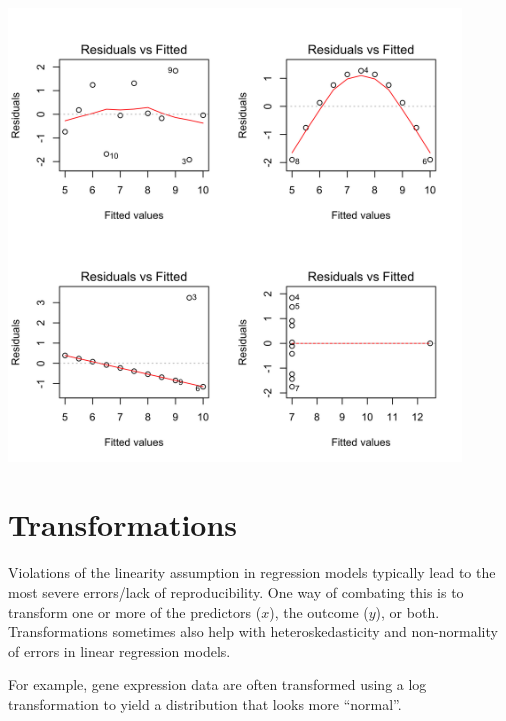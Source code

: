 \begin{center}
\includegraphics[width=0.9\textwidth]{img/anscombe-diagnostics-1.png}
\end{center}

\newpage


\section{Transformations}

Violations of the linearity assumption in regression models typically lead to the most severe errors/lack of reproducibility. One way of combating this is to transform one or more of the predictors ($x$), the outcome ($y$), or both. Transformations sometimes also help with heteroskedasticity and non-normality of errors in linear regression models.

For example, gene expression data are often transformed using a log transformation to yield a distribution that looks more ``normal''.

